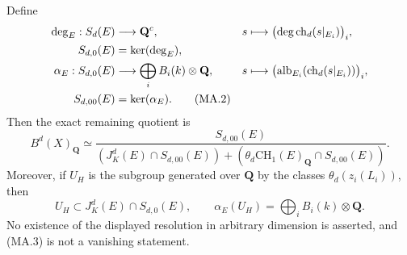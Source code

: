 Define
\begin{align}
 \deg_E:S_d(E)&\longrightarrow\mathbf Q^c,&
 s&\longmapsto
 \bigl(\deg\operatorname{ch}_d(s|_{E_i})\bigr)_i,\notag\\
 S_{d,0}(E)&=\ker(\deg_E),\notag\\
 \alpha_E:S_{d,0}(E)&\longrightarrow
                   \bigoplus_iB_i(k)\otimes\mathbf Q,&
 s&\longmapsto
 \bigl(\operatorname{alb}_{E_i}
             (\operatorname{ch}_d(s|_{E_i}))\bigr)_i,\notag\\
 S_{d,00}(E)&=\ker(\alpha_E).                           \tag{MA.2}
\end{align}
Then the exact remaining quotient is
\begin{equation}
 B^d(X)_{\mathbf Q}\simeq
 \frac{S_{d,00}(E)}
 {(J_K^d(E)\cap S_{d,00}(E))+
  (\theta_d\mathrm{CH}_1(E)_{\mathbf Q}\cap S_{d,00}(E))}.
                                                        \tag{MA.3}
\end{equation}
Moreover, if $U_H$ is the subgroup generated over $\mathbf Q$ by
the classes $\theta_d(z_i(L_i))$, then
\begin{equation}
 U_H\subset J_K^d(E)\cap S_{d,0}(E),\qquad
 \alpha_E(U_H)=\bigoplus_iB_i(k)\otimes\mathbf Q.         \tag{MA.4}
\end{equation}
No existence of the displayed resolution in arbitrary dimension
is asserted, and (MA.3) is not a vanishing statement.


